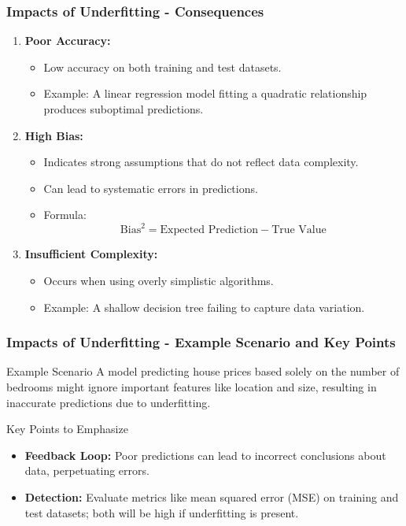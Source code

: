 \documentclass[aspectratio=169]{beamer}
\begin{document}
\begin{frame}[fragile]
    \frametitle{Impacts of Underfitting - Consequences}
    \begin{enumerate}
        \item \textbf{Poor Accuracy:}
        \begin{itemize}
            \item Low accuracy on both training and test datasets.
            \item Example: A linear regression model fitting a quadratic relationship produces suboptimal predictions.
        \end{itemize}

        \item \textbf{High Bias:}
        \begin{itemize}
            \item Indicates strong assumptions that do not reflect data complexity.
            \item Can lead to systematic errors in predictions.
            \item Formula: 
            \begin{equation}
                \text{Bias}^2 = \text{Expected Prediction} - \text{True Value}
            \end{equation}
        \end{itemize}

        \item \textbf{Insufficient Complexity:}
        \begin{itemize}
            \item Occurs when using overly simplistic algorithms.
            \item Example: A shallow decision tree failing to capture data variation.
        \end{itemize}
    \end{enumerate}
\end{frame}

\begin{frame}[fragile]
    \frametitle{Impacts of Underfitting - Example Scenario and Key Points}
    \begin{block}{Example Scenario}
        A model predicting house prices based solely on the number of bedrooms might ignore important features like location and size, resulting in inaccurate predictions due to underfitting.
    \end{block}

    \begin{block}{Key Points to Emphasize}
        \begin{itemize}
            \item \textbf{Feedback Loop:} Poor predictions can lead to incorrect conclusions about data, perpetuating errors.
            \item \textbf{Detection:} Evaluate metrics like mean squared error (MSE) on training and test datasets; both will be high if underfitting is present.
        \end{itemize}
    \end{block}
\end{frame}
\end{document}
